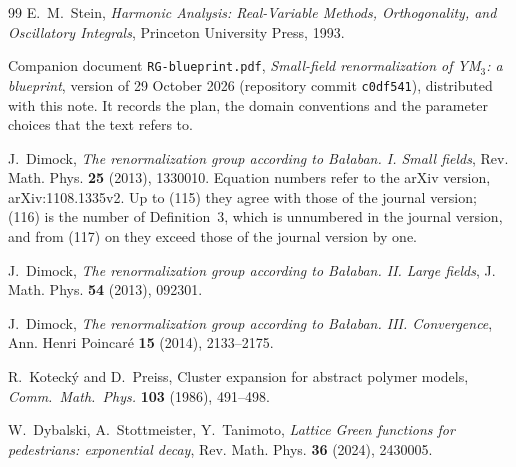 \begin{thebibliography}{99}
E.~M.~Stein, \emph{Harmonic Analysis: Real-Variable Methods, Orthogonality, and Oscillatory Integrals}, Princeton University Press, 1993.

Companion document \texttt{RG-blueprint.pdf}, \emph{Small-field renormalization of YM$_3$: a blueprint}, version of 29 October 2026 (repository commit \texttt{c0df541}), distributed with this note. It records the plan, the domain conventions and the parameter choices that the text refers to.

J.~Dimock, \emph{The renormalization group according to Ba\l aban. I. Small fields}, Rev. Math. Phys. \textbf{25} (2013), 1330010. Equation numbers refer to the arXiv version, arXiv:1108.1335v2. Up to (115) they agree with those of the journal version; (116) is the number of Definition~3, which is unnumbered in the journal version, and from (117) on they exceed those of the journal version by one.

J.~Dimock, \emph{The renormalization group according to Ba\l aban. II. Large fields}, J. Math. Phys. \textbf{54} (2013), 092301.

J.~Dimock, \emph{The renormalization group according to Ba\l aban. III. Convergence}, Ann. Henri Poincar\'e \textbf{15} (2014), 2133--2175.

R.~Koteck\'y and D.~Preiss, Cluster expansion for abstract polymer models, \emph{Comm.\ Math.\ Phys.} \textbf{103} (1986), 491--498.

W.~Dybalski, A.~Stottmeister, Y.~Tanimoto, \emph{Lattice Green functions for pedestrians: exponential decay}, Rev. Math. Phys. \textbf{36} (2024), 2430005.

\end{thebibliography}
